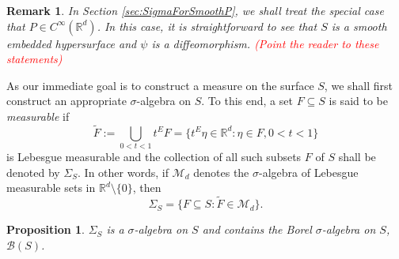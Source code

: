 \documentclass[11pt]{article}
\theoremstyle{theorem}
\newtheorem{proposition}[theorem]{Proposition}
\newtheorem{remark}{Remark}
\begin{document}
\begin{remark}In Section \ref{sec:SigmaForSmoothP}, we shall treat the special case that $P\in C^{\infty}(\mathbb{R}^d)$. In this case, it is straightforward to see that $S$ is a smooth embedded hypersurface and $\psi$ is a diffeomorphism. \textcolor{red}{(Point the reader to these statements)}
\end{remark}

\noindent As our immediate goal is to construct a measure on the surface $S$, we shall first construct an appropriate $\sigma$-algebra on $S$. To this end, a set $F\subseteq S$ is said to be \textit{measurable} if
\begin{equation*}
\widetilde F:=\bigcup_{0<t<1}t^E F=\{t^E\eta\in\mathbb{R}^d:\eta\in F,0<t<1\}
\end{equation*}
is Lebesgue measurable and the collection of all such subsets $F$ of $S$ shall be denoted by $\Sigma_S$. In other words, if $\mathcal{M}_d$ denotes the $\sigma$-algebra of Lebesgue measurable sets in $\mathbb{R}^d\setminus\{0\}$, then
\begin{equation*}
\Sigma_S=\{F\subseteq S:\widetilde{F}\in\mathcal{M}_d\}.
\end{equation*}


\begin{proposition}\label{prop:BorelContainment}
$\Sigma_S$ is a $\sigma$-algebra on $S$ and contains the Borel $\sigma$-algebra on $S$, $\mathcal{B}(S)$.
\end{proposition}
\end{document}
